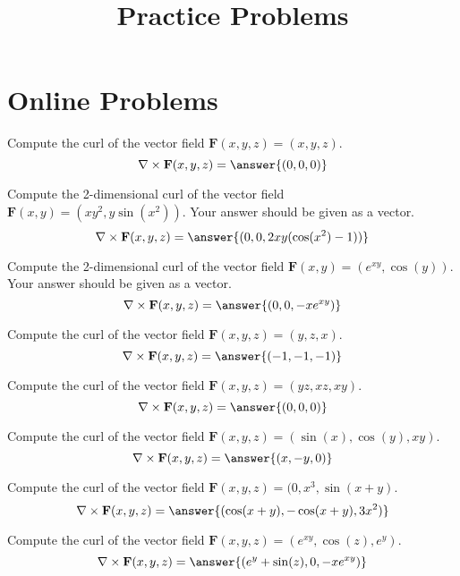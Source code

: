 \documentclass{ximera}
\title{Practice Problems}
\begin{document}
\begin{abstract}
\end{abstract}
\maketitle
\section{Online Problems}
\begin{problem}
Compute the curl of the vector field $\mathbf{F}(x,y,z) = (x,y,z)$.
\[
\nabla\times\mathbf{F}(x,y,z) = \answer{(0,0,0)}
\]
\end{problem}

\begin{problem}
Compute the 2-dimensional curl of the vector field $\mathbf{F}(x,y) = (xy^2,y\sin(x^2))$. Your answer should be given as a vector.
\[
\nabla\times\mathbf{F}(x,y,z) = \answer{(0,0,2xy(\cos(x^2)-1))}
\]
\end{problem}

\begin{problem}
Compute the 2-dimensional curl of the vector field $\mathbf{F}(x,y) = (e^{xy},\cos(y))$. Your answer should be given as a vector.
\[
\nabla\times\mathbf{F}(x,y,z) = \answer{(0,0,-xe^{xy})}
\]
\end{problem}

\begin{problem}
Compute the curl of the vector field $\mathbf{F}(x,y,z) = (y,z,x)$.
\[
\nabla\times\mathbf{F}(x,y,z) = \answer{(-1,-1,-1)}
\]
\end{problem}

\begin{problem}
Compute the curl of the vector field $\mathbf{F}(x,y,z) = (yz,xz,xy)$.
\[
\nabla\times\mathbf{F}(x,y,z) = \answer{(0,0,0)}
\]
\end{problem}

\begin{problem}
Compute the curl of the vector field $\mathbf{F}(x,y,z) = (\sin(x),\cos(y),xy)$.
\[
\nabla\times\mathbf{F}(x,y,z) = \answer{(x,-y,0)}
\]
\end{problem}

\begin{problem}
Compute the curl of the vector field $\mathbf{F}(x,y,z) = (0,x^3,\sin(x+y)$.
\[
\nabla\times\mathbf{F}(x,y,z) = \answer{(\cos(x+y),-\cos(x+y),3x^2)}
\]
\end{problem}

\begin{problem}
Compute the curl of the vector field $\mathbf{F}(x,y,z) = (e^{xy},\cos(z),e^{y})$.
\[
\nabla\times\mathbf{F}(x,y,z) = \answer{(e^y+\sin(z),0,-xe^{xy})}
\]
\end{problem}
\end{document}
